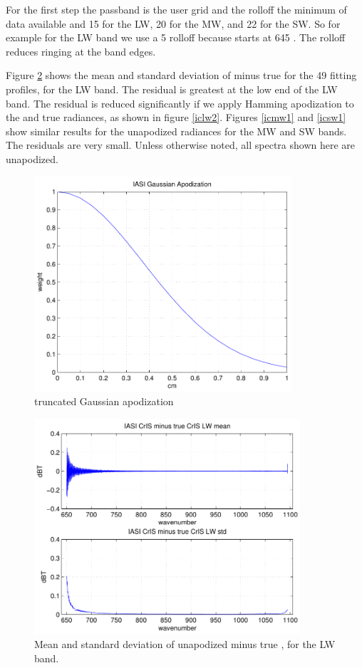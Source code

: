 \documentclass[12pt]{article}
\begin{document}
For the first step the passband is the {\cris} user grid and the
rolloff the minimum of data available and 15 {\wn} for the LW, 20
{\wn} for the MW, and 22 {\wn} for the SW.  So for example for the 
LW band we use a 5 {\wn} rolloff because {\iasi} starts at 645 {\wn}.
The rolloff reduces ringing at the band edges.

Figure \ref{iclw1} shows the mean and standard deviation of {\iasi}
{\cris} minus true {\cris} for the 49 fitting profiles, for the
{\cris} LW band.  The residual is greatest at the low end of the LW
band.  The residual is reduced significantly if we apply Hamming
apodization to the {\iasi} {\cris} and true {\cris} radiances, as
shown in figure \ref{iclw2}.  Figures \ref{icmw1} and \ref{icsw1}
show similar results for the unapodized radiances for the MW and SW
bands. The residuals are very small.  Unless otherwise noted, all
{\cris} spectra shown here are unapodized.


\begin{figure}
  \centering
  \includegraphics[height=8cm]{figures/iasi_gauss_app.pdf}
  \caption{{\iasi} truncated Gaussian apodization}
  \label{igauss}
\end{figure}

\begin{figure}
  \centering
  \includegraphics[height=8cm]{figures/iasi_cris_lw_1.pdf}
  \caption{Mean and standard deviation of unapodized {\iasi} {\cris}
    minus true {\cris}, for the {\cris} LW band.}
  \label{iclw1}
\end{figure}
\end{document}
